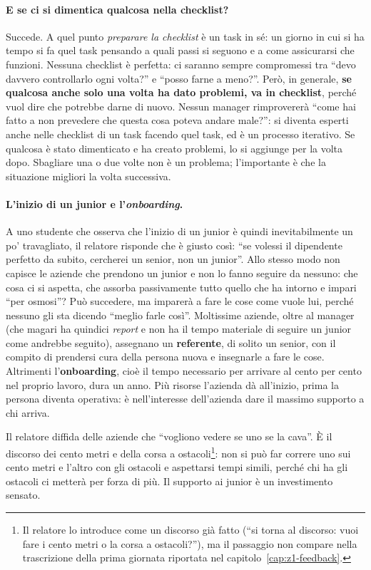 \paragraph{E se ci si dimentica qualcosa nella checklist?} Succede. A quel
punto \emph{preparare la checklist} è un task in sé: un giorno in cui si ha
tempo si fa quel task pensando a quali passi si seguono e a come assicurarsi che
funzioni. Nessuna checklist è perfetta: ci saranno sempre compromessi tra ``devo
davvero controllarlo ogni volta?'' e ``posso farne a meno?''. Però, in generale,
\textbf{se qualcosa anche solo una volta ha dato problemi, va in checklist},
perché vuol dire che potrebbe darne di nuovo. Nessun manager rimprovererà
``come hai fatto a non prevedere che questa cosa poteva andare male?'': si
diventa esperti anche nelle checklist di un task facendo quel task, ed è un
processo iterativo. Se qualcosa è stato dimenticato e ha creato problemi, lo si
aggiunge per la volta dopo. Sbagliare una o due volte non è un problema;
l'importante è che la situazione migliori la volta successiva.

\paragraph{L'inizio di un junior e l'\emph{onboarding}.} A uno studente che
osserva che l'inizio di un junior è quindi inevitabilmente un po' travagliato,
il relatore risponde che è giusto così: ``se volessi il dipendente perfetto da
subito, cercherei un senior, non un junior''. Allo stesso modo non capisce le
aziende che prendono un junior e non lo fanno seguire da nessuno: che cosa ci si
aspetta, che assorba passivamente tutto quello che ha intorno e impari ``per
osmosi''? Può succedere, ma imparerà a fare le cose come vuole lui, perché
nessuno gli sta dicendo ``meglio farle così''. Moltissime aziende, oltre al
manager (che magari ha quindici \emph{report} e non ha il tempo materiale di
seguire un junior come andrebbe seguito), assegnano un \textbf{referente}, di
solito un senior, con il compito di prendersi cura della persona nuova e
insegnarle a fare le cose. Altrimenti l'\textbf{onboarding}, cioè il tempo
necessario per arrivare al cento per cento nel proprio lavoro, dura un anno.
Più risorse l'azienda dà all'inizio, prima la persona diventa operativa: è
nell'interesse dell'azienda dare il massimo supporto a chi arriva.

Il relatore diffida delle aziende che ``vogliono vedere se uno se la cava''. È
il discorso dei cento metri e della corsa a ostacoli\footnote{Il relatore lo
introduce come un discorso già fatto (``si torna al discorso: vuoi fare i cento
metri o la corsa a ostacoli?''), ma il passaggio non compare nella trascrizione
della prima giornata riportata nel capitolo~\ref{cap:z1-feedback}.}: non si può
far correre uno sui cento metri e l'altro con gli ostacoli e aspettarsi tempi
simili, perché chi ha gli ostacoli ci metterà per forza di più. Il supporto ai junior è un
investimento sensato.


